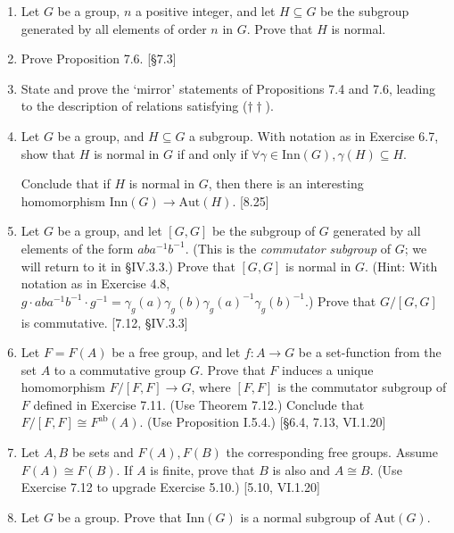 \begin{enumerate}
    \item Let $G$ be a group, $n$ a positive integer, and let $H \subseteq G$ be the subgroup generated by all elements of order $n$ in $G$. Prove that $H$ is normal.

    \item Prove Proposition 7.6. [\S7.3]

    \item State and prove the `mirror' statements of Propositions 7.4 and 7.6, leading to the description of relations satisfying ($\dagger\dagger$).

    \item Let $G$ be a group, and $H \subseteq G$ a subgroup. With notation as in Exercise 6.7, show that $H$ is normal in $G$ if and only if $\forall \gamma \in \text{Inn}(G), \gamma(H) \subseteq H$.

          Conclude that if $H$ is normal in $G$, then there is an interesting homomorphism $\text{Inn}(G) \to \text{Aut}(H)$. [8.25]

    \item Let $G$ be a group, and let $[G,G]$ be the subgroup of $G$ generated by all elements of the form $aba^{-1}b^{-1}$. (This is the \textit{commutator subgroup} of $G$; we will return to it in \S IV.3.3.) Prove that $[G,G]$ is normal in $G$. (Hint: With notation as in Exercise 4.8, $g \cdot aba^{-1}b^{-1} \cdot g^{-1} = \gamma_g(a)\gamma_g(b)\gamma_g(a)^{-1}\gamma_g(b)^{-1}$.) Prove that $G/[G,G]$ is commutative. [7.12, \S IV.3.3]

    \item Let $F = F(A)$ be a free group, and let $f: A \to G$ be a set-function from the set $A$ to a commutative group $G$. Prove that $F$ induces a unique homomorphism $F/[F,F] \to G$, where $[F,F]$ is the commutator subgroup of $F$ defined in Exercise 7.11. (Use Theorem 7.12.) Conclude that $F/[F,F] \cong F^{\text{ab}}(A)$. (Use Proposition I.5.4.) [\S6.4, 7.13, VI.1.20]

    \item Let $A, B$ be sets and $F(A), F(B)$ the corresponding free groups. Assume $F(A) \cong F(B)$. If $A$ is finite, prove that $B$ is also and $A \cong B$. (Use Exercise 7.12 to upgrade Exercise 5.10.) [5.10, VI.1.20]

    \item Let $G$ be a group. Prove that $\text{Inn}(G)$ is a normal subgroup of $\text{Aut}(G)$.
\end{enumerate}